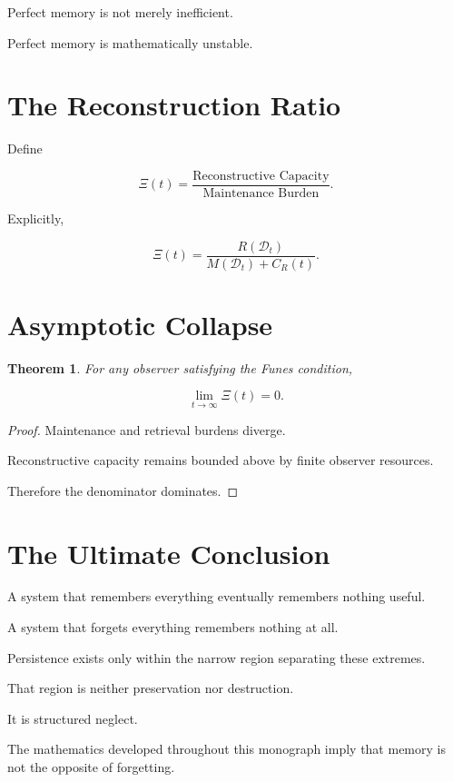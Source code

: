 \documentclass[12pt,oneside]{book}
\theoremstyle{plain} \newtheorem{theorem}{Theorem}[chapter] \newtheorem{lemma}[theorem]{Lemma} \newtheorem{proposition}[theorem]{Proposition} \newtheorem{corollary}[theorem]{Corollary}
\theoremstyle{definition} \newtheorem{definition}[theorem]{Definition} \newtheorem{axiom}[theorem]{Axiom} \newtheorem{construction}[theorem]{Construction}
\theoremstyle{remark} \newtheorem{remark}[theorem]{Remark} \newtheorem{example}[theorem]{Example}
\newcommand{\D}{\mathcal{D}} \newcommand{\R}{\mathcal{R}} \newcommand{\F}{\mathcal{F}} \newcommand{\U}{\mathcal{U}} \newcommand{\M}{\mathcal{M}} \newcommand{\G}{\Gamma}
\begin{document}
Perfect memory is not merely inefficient.

Perfect memory is mathematically unstable.

\section{The Reconstruction Ratio}

Define

\[
\Xi(t)
=
\frac{\text{Reconstructive Capacity}}
{\text{Maintenance Burden}}.
\]

Explicitly,

\[
\Xi(t)
=
\frac{R(\D_t)}
{M(\D_t)+C_R(t)}.
\]

\section{Asymptotic Collapse}

\begin{theorem}

For any observer satisfying the Funes condition,

\[
\lim_{t\to\infty}
\Xi(t)
=
0. 

\]

\end{theorem}

\begin{proof}

Maintenance and retrieval burdens diverge.

Reconstructive capacity remains bounded above by finite observer resources.

Therefore the denominator dominates.

\end{proof}

\section{The Ultimate Conclusion}

A system that remembers everything eventually remembers nothing useful.

A system that forgets everything remembers nothing at all.

Persistence exists only within the narrow region separating these extremes.

That region is neither preservation nor destruction.

It is structured neglect.

The mathematics developed throughout this monograph imply that memory is not the opposite of forgetting.
\end{document}
